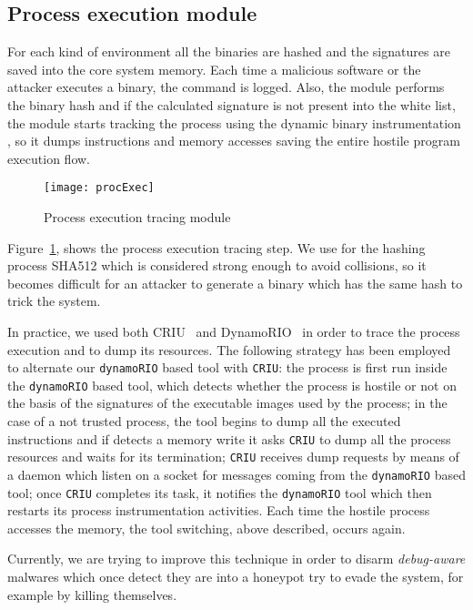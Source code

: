 \subsection{Process execution module}
\label{sub:proc}
For each kind of environment all the binaries are hashed and the signatures are saved into the core system memory. Each time a malicious software or the attacker executes a binary, the command is logged. Also, the module performs the binary hash and if the calculated signature is not present into the white list, the module starts tracking the process using the dynamic binary instrumentation \cite{Hazelwood2011}, so it dumps instructions and memory accesses saving the entire hostile program execution flow.


\begin{figure}[btp]

\texttt{[image: procExec]}
\caption{Process execution tracing module}
\label{fig:procexec}
\end{figure}
Figure~\ref{fig:procexec}, shows the process execution tracing step. We use for the hashing process SHA512 which is considered strong enough to avoid collisions, so it becomes difficult for an attacker to generate a binary which has the same hash to trick the system. 

In practice, we used both CRIU~\cite{criu2014} and DynamoRIO~\cite{Bruening2003a} in order to trace the process execution and to dump its resources. The following strategy has been employed to alternate our \texttt{dynamoRIO} based tool with \texttt{CRIU}:  the process is first run inside the \texttt{dynamoRIO} based tool, which detects whether the process is hostile or not on the basis of the signatures of the executable images used by the process; in the case of a not trusted process, the tool begins to dump all the executed instructions and if detects a memory write it asks \texttt{CRIU} to dump all the process resources and waits for its termination; \texttt{CRIU}
receives dump requests by means of a daemon which listen on a socket for messages coming from the \texttt{dynamoRIO} based tool; once \texttt{CRIU} completes its task, it notifies the \texttt{dynamoRIO} tool which then restarts its process instrumentation activities. 
Each time the hostile process accesses the memory, the tool switching, above described, occurs again. 

Currently, we are trying to improve this technique in order to disarm \textit{debug-aware} malwares which once detect they are into a honeypot try to evade the system, for example by killing themselves.


 






